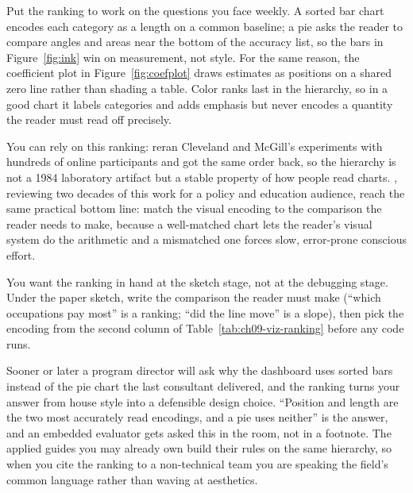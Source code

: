 Put the ranking to work on the questions you face weekly. A sorted bar chart encodes each category as a length on a common baseline; a pie asks the reader to compare angles and areas near the bottom of the accuracy list, so the bars in Figure~\ref{fig:ink} win on measurement, not style. For the same reason, the coefficient plot in Figure~\ref{fig:coefplot} draws estimates as positions on a shared zero line rather than shading a table. Color ranks last in the hierarchy, so in a good chart it labels categories and adds emphasis but never encodes a quantity the reader must read off precisely.

You can rely on this ranking: \textcite{heer2010crowdsourcing} reran Cleveland and McGill's experiments with hundreds of online participants and got the same order back, so the hierarchy is not a 1984 laboratory artifact but a stable property of how people read charts. \textcite{franconeri2021science}, reviewing two decades of this work for a policy and education audience, reach the same practical bottom line: match the visual encoding to the comparison the reader needs to make, because a well-matched chart lets the reader's visual system do the arithmetic and a mismatched one forces slow, error-prone conscious effort.

You want the ranking in hand at the sketch stage, not at the debugging stage. Under the paper sketch, write the comparison the reader must make (\enquote{which occupations pay most} is a ranking; \enquote{did the line move} is a slope), then pick the encoding from the second column of Table~\ref{tab:ch09-viz-ranking} before any code runs.

Sooner or later a program director will ask why the dashboard uses sorted bars instead of the pie chart the last consultant delivered, and the ranking turns your answer from house style into a defensible design choice. \enquote{Position and length are the two most accurately read encodings, and a pie uses neither} is the answer, and an embedded evaluator gets asked this in the room, not in a footnote. The applied guides you may already own build their rules on the same hierarchy, so when you cite the ranking to a non-technical team you are speaking the field's common language rather than waving at aesthetics.

